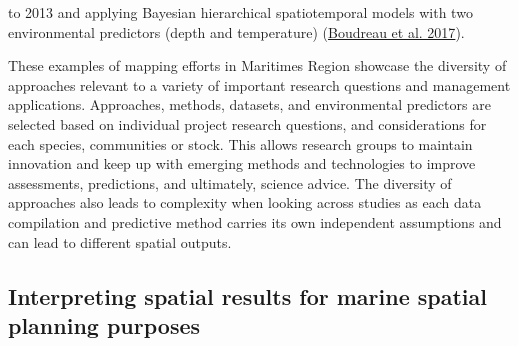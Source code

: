 \documentclass[12pt]{article}\usepackage[]{graphicx}\usepackage[]{color}
\begin{document}
to 2013 and applying Bayesian hierarchical spatiotemporal models with two environmental predictors (depth and temperature) (\protect\hyperlink{ref-Boudreau:2017}{Boudreau et al. 2017}).

These examples of mapping efforts in Maritimes Region showcase the diversity of approaches relevant to a variety of important research questions and management applications. Approaches, methods, datasets, and environmental predictors are selected based on individual project research questions, and considerations for each species, communities or stock. This allows research groups to maintain innovation and keep up with emerging methods and technologies to improve assessments, predictions, and ultimately, science advice. The diversity of approaches also leads to complexity when looking across studies as each data compilation and predictive method carries its own independent assumptions and can lead to different spatial outputs.

\hypertarget{interpreting-spatial-results-for-marine-spatial-planning-purposes}{%
\subsection{Interpreting spatial results for marine spatial planning purposes}\label{interpreting-spatial-results-for-marine-spatial-planning-purposes}}
\end{document}
